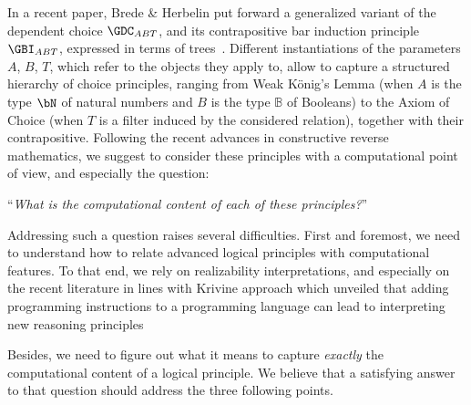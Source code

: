 In a recent paper, Brede \& Herbelin put forward a generalized variant of the dependent choice $\GDC_{ABT}$, and its contrapositive bar induction principle $\GBI_{ABT}$, expressed in terms of trees~\cite{BreHer21}.
Different instantiations of the parameters $A$, $B$, $T$, which refer to the objects they apply to, allow to capture
a structured hierarchy of choice principles, ranging from Weak K\"onig's Lemma
(when $A$ is the type $\bN$ of natural numbers and $B$ is the type $\mathbb{B}$ of Booleans)
to the Axiom of Choice
(when $T$ is a filter induced by the considered relation), together with their contrapositive.
Following the recent advances in constructive reverse mathematics, we suggest to consider these principles with a computational point of view, and especially the question:
\begin{center}
 ``\emph{What is the computational content of each of these principles?}''
\end{center}







Addressing such a question raises several difficulties.
First and foremost, we need to understand how to relate advanced logical principles with computational features.
To that end, we rely on realizability interpretations, and especially on the recent literature in lines with Krivine approach which unveiled that adding programming instructions to a programming language can lead to interpreting new reasoning principles~\cite{Griffin90,Krivine04,Miquel11,Miquey18a,Geoffroy18,CohFarTat19,Blot22}

Besides, we need to figure out what it means to  capture \emph{exactly} the computational content of a logical principle. We believe that a satisfying answer to that question should address the three following points.

